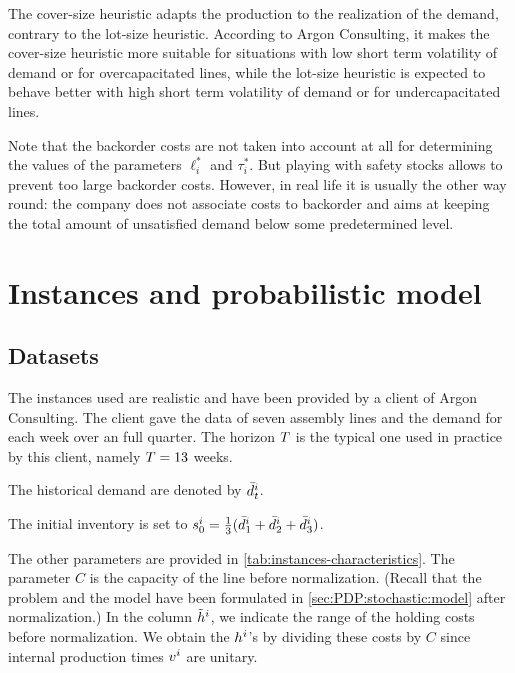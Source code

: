 \medskip

The cover-size heuristic adapts the production to the realization of the demand, contrary to the lot-size heuristic.
According to Argon Consulting, it makes the cover-size heuristic more suitable for situations with low short term volatility of demand or for overcapacitated lines, while the lot-size heuristic is expected to behave better with high short term volatility of demand or for undercapacitated lines.


Note that the backorder costs are not taken into account at all for determining the values of the parameters $\ell_i^*$ and $\tau_i^*$.
But playing with safety stocks allows to prevent too large backorder costs.
However, in real life it is usually the other way round: the company does not associate costs to backorder and aims at keeping the total amount of unsatisfied demand below some predetermined level.




\section{Instances and probabilistic model}
\label{sec:PDP:numerical-experiments:instances}


\subsection{Datasets}
\label{sec:PDP:numerical-experiments:historical-data}

The instances used are realistic and have been provided by a client of Argon Consulting.
The client gave the data of seven assembly lines and the demand for each week over an full quarter.
The horizon $T$ is the typical one used in practice by this client, namely $T=13$ weeks.

The historical demand are denoted by $\bar{d}_t^i$.

The initial inventory is set to $s_0^i=\frac{1}{3}(\bar{d}_1^i+\bar{d}_2^i+\bar{d}_3^i)$.

The other parameters are provided in \cref{tab:instances-characteristics}.
The parameter $C$ is the capacity of the line before normalization.
(Recall that the problem and the model have been formulated in \cref{sec:PDP:stochastic:model} after normalization.)
In the column $\tilde{h}^i$, we indicate the range of the holding costs before normalization.
We obtain the $h^i$'s by dividing these costs by $C$ since internal production times $v^i$ are unitary.

